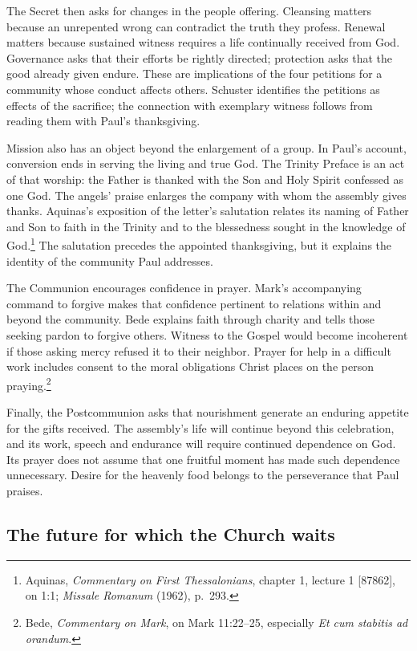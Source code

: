 The Secret then asks for changes in the people offering. Cleansing matters because an unrepented wrong can contradict the truth they profess. Renewal matters because sustained witness requires a life continually received from God. Governance asks that their efforts be rightly directed; protection asks that the good already given endure. These are implications of the four petitions for a community whose conduct affects others. Schuster identifies the petitions as effects of the sacrifice; the connection with exemplary witness follows from reading them with Paul's thanksgiving.

Mission also has an object beyond the enlargement of a group. In Paul's account, conversion ends in serving the living and true God. The Trinity Preface is an act of that worship: the Father is thanked with the Son and Holy Spirit confessed as one God. The angels' praise enlarges the company with whom the assembly gives thanks. Aquinas's exposition of the letter's salutation relates its naming of Father and Son to faith in the Trinity and to the blessedness sought in the knowledge of God.\footnote{Aquinas, \textit{Commentary on First Thessalonians}, chapter 1, lecture 1 [87862], on 1:1; \textit{Missale Romanum} (1962), p.~293.} The salutation precedes the appointed thanksgiving, but it explains the identity of the community Paul addresses.

The Communion encourages confidence in prayer. Mark's accompanying command to forgive makes that confidence pertinent to relations within and beyond the community. Bede explains faith through charity and tells those seeking pardon to forgive others. Witness to the Gospel would become incoherent if those asking mercy refused it to their neighbor. Prayer for help in a difficult work includes consent to the moral obligations Christ places on the person praying.\footnote{Bede, \textit{Commentary on Mark}, on Mark 11:22--25, especially \textit{Et cum stabitis ad orandum}.}

Finally, the Postcommunion asks that nourishment generate an enduring appetite for the gifts received. The assembly's life will continue beyond this celebration, and its work, speech and endurance will require continued dependence on God. Its prayer does not assume that one fruitful moment has made such dependence unnecessary. Desire for the heavenly food belongs to the perseverance that Paul praises.

\subsection{The future for which the Church waits}


